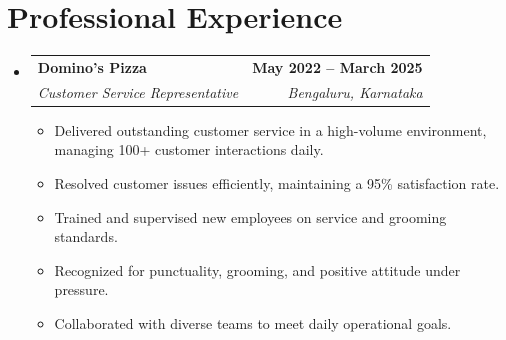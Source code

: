\documentclass[a4paper,11pt]{article}
\makeatletter
\newcommand{\resumeItem}[1]{
	\item\small{#1 \vspace{-2pt}}
}
\newcommand{\resumeSubheading}[4]{
	\vspace{-2pt}\item
		\begin{tabular*}{0.97\textwidth}[t]{l@{\extracolsep{\fill}}r}
			\textbf{#1} & \textbf{\small #2} \\
			\textit{\small#3} & \textit{\small #4} \\
		\end{tabular*}\vspace{-7pt}
}
\newcommand{\resumeSubHeadingListStart}{\begin{itemize}[leftmargin=0.15in, label={}]}
\newcommand{\resumeSubHeadingListEnd}{\end{itemize}}
\newcommand{\resumeItemListStart}{\begin{itemize}}
\newcommand{\resumeItemListEnd}{\end{itemize}\vspace{-5pt}}
\makeatother
\begin{document}

\section{Professional Experience }
\resumeSubHeadingListStart
\resumeSubheading
{Domino's Pizza}{May 2022 -- March 2025}
{Customer Service Representative}{Bengaluru, Karnataka}
\resumeItemListStart
\resumeItem{ Delivered outstanding customer service in a high-volume environment, managing 100+ customer interactions daily. }
\resumeItem{ Resolved customer issues efficiently, maintaining a 95\% satisfaction rate.}
\resumeItem{Trained and supervised new employees on service and grooming standards. }
\resumeItem{ Recognized for punctuality, grooming, and positive attitude under pressure. }
\resumeItem{ Collaborated with diverse teams to meet daily operational goals.}
\resumeItemListEnd
\resumeSubHeadingListEnd
\end{document}
